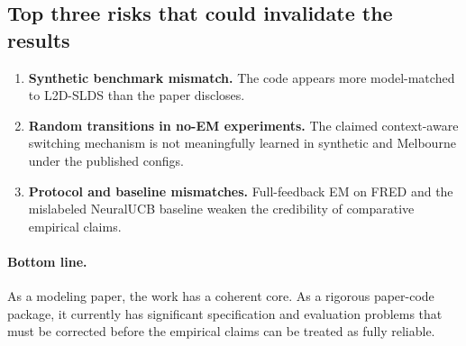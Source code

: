 \documentclass[11pt]{article}
\begin{document}
\subsection{Top three risks that could invalidate the results}

\begin{enumerate}
    \item \textbf{Synthetic benchmark mismatch.} The code appears more
    model-matched to L2D-SLDS than the paper discloses.
    \item \textbf{Random transitions in no-EM experiments.} The claimed
    context-aware switching mechanism is not meaningfully learned in synthetic
    and Melbourne under the published configs.
    \item \textbf{Protocol and baseline mismatches.} Full-feedback EM on FRED and
    the mislabeled NeuralUCB baseline weaken the credibility of comparative
    empirical claims.
\end{enumerate}

\paragraph{Bottom line.}
As a modeling paper, the work has a coherent core. As a rigorous paper-code
package, it currently has significant specification and evaluation problems that
must be corrected before the empirical claims can be treated as fully reliable.
\end{document}
